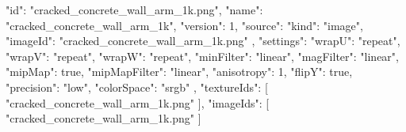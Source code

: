 {
  "id": "cracked_concrete_wall_arm_1k.png",
  "name": "cracked_concrete_wall_arm_1k",
  "version": 1,
  "source": {
    "kind": "image",
    "imageId": "cracked_concrete_wall_arm_1k.png"
  },
  "settings": {
    "wrapU": "repeat",
    "wrapV": "repeat",
    "wrapW": "repeat",
    "minFilter": "linear",
    "magFilter": "linear",
    "mipMap": true,
    "mipMapFilter": "linear",
    "anisotropy": 1,
    "flipY": true,
    "precision": "low",
    "colorSpace": "srgb"
  },
  "textureIds": [
    "cracked_concrete_wall_arm_1k.png"
  ],
  "imageIds": [
    "cracked_concrete_wall_arm_1k.png"
  ]
}
